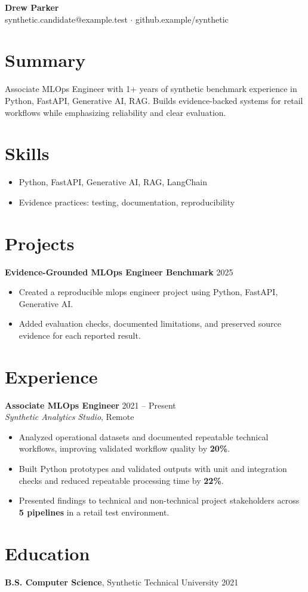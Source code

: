 \documentclass[10pt,letterpaper]{article}
\begin{document}
\begin{center}
{\Large \textbf{Drew Parker}}\\
synthetic.candidate@example.test $\cdot$ github.example/synthetic
\end{center}

\section*{Summary}
Associate MLOps Engineer with 1+ years of synthetic benchmark experience in Python, FastAPI, Generative AI, RAG. Builds evidence-backed systems for retail workflows while emphasizing reliability and clear evaluation.

\section*{Skills}
\begin{itemize}
  \item Python, FastAPI, Generative AI, RAG, LangChain
  \item Evidence practices: testing, documentation, reproducibility
\end{itemize}

\section*{Projects}
\textbf{Evidence-Grounded MLOps Engineer Benchmark} \hfill 2025
\begin{itemize}
  \item Created a reproducible mlops engineer project using Python, FastAPI, Generative AI.
  \item Added evaluation checks, documented limitations, and preserved source evidence for each reported result.
\end{itemize}

\section*{Experience}
\textbf{Associate MLOps Engineer} \hfill 2021 -- Present\\
\textit{Synthetic Analytics Studio}, Remote
\begin{itemize}
  \item Analyzed operational datasets and documented repeatable technical workflows, improving validated workflow quality by \textbf{20\%}.
  \item Built Python prototypes and validated outputs with unit and integration checks and reduced repeatable processing time by \textbf{22\%}.
  \item Presented findings to technical and non-technical project stakeholders across \textbf{5 pipelines} in a retail test environment.
\end{itemize}

\section*{Education}
\textbf{B.S. Computer Science}, Synthetic Technical University \hfill 2021
\end{document}
